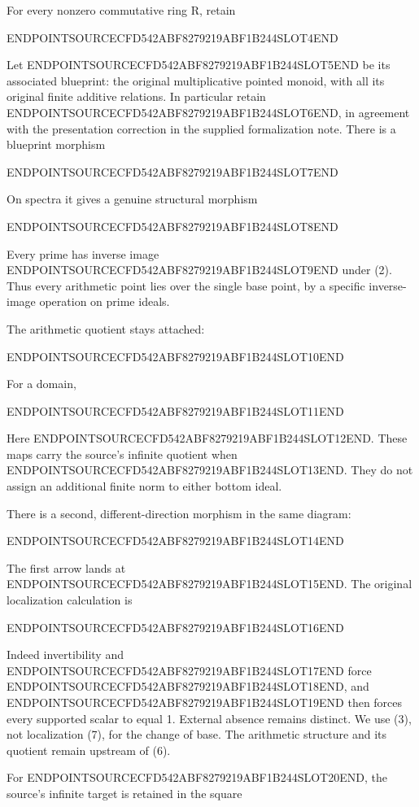 For every nonzero commutative ring R, retain

ENDPOINTSOURCECFD542ABF8279219ABF1B244SLOT4END

Let ENDPOINTSOURCECFD542ABF8279219ABF1B244SLOT5END be its associated blueprint: the original multiplicative pointed monoid, with all its original finite additive relations. In particular retain ENDPOINTSOURCECFD542ABF8279219ABF1B244SLOT6END, in agreement with the presentation correction in the supplied formalization note. There is a blueprint morphism

ENDPOINTSOURCECFD542ABF8279219ABF1B244SLOT7END

On spectra it gives a genuine structural morphism

ENDPOINTSOURCECFD542ABF8279219ABF1B244SLOT8END

Every prime has inverse image ENDPOINTSOURCECFD542ABF8279219ABF1B244SLOT9END under (2). Thus every arithmetic point lies over the single base point, by a specific inverse-image operation on prime ideals.

The arithmetic quotient stays attached:

ENDPOINTSOURCECFD542ABF8279219ABF1B244SLOT10END

For a domain,

ENDPOINTSOURCECFD542ABF8279219ABF1B244SLOT11END

Here ENDPOINTSOURCECFD542ABF8279219ABF1B244SLOT12END. These maps carry the source's infinite quotient when ENDPOINTSOURCECFD542ABF8279219ABF1B244SLOT13END. They do not assign an additional finite norm to either bottom ideal.

There is a second, different-direction morphism in the same diagram:

ENDPOINTSOURCECFD542ABF8279219ABF1B244SLOT14END

The first arrow lands at ENDPOINTSOURCECFD542ABF8279219ABF1B244SLOT15END. The original localization calculation is

ENDPOINTSOURCECFD542ABF8279219ABF1B244SLOT16END

Indeed invertibility and ENDPOINTSOURCECFD542ABF8279219ABF1B244SLOT17END force ENDPOINTSOURCECFD542ABF8279219ABF1B244SLOT18END, and ENDPOINTSOURCECFD542ABF8279219ABF1B244SLOT19END then forces every supported scalar to equal 1. External absence remains distinct. We use (3), not localization (7), for the change of base. The arithmetic structure and its quotient remain upstream of (6).

For ENDPOINTSOURCECFD542ABF8279219ABF1B244SLOT20END, the source's infinite target is retained in the square

